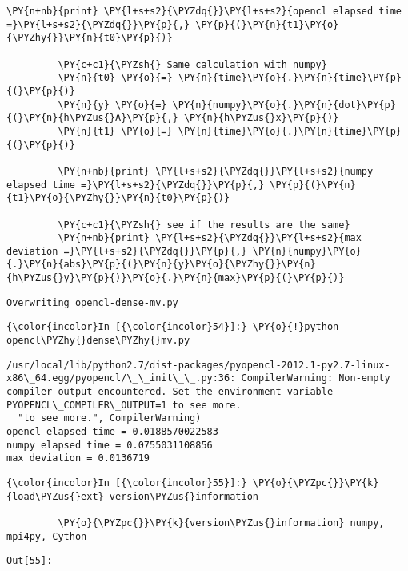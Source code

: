 \begin{Verbatim}[commandchars=\\\{\}]
         \PY{n+nb}{print} \PY{l+s+s2}{\PYZdq{}}\PY{l+s+s2}{opencl elapsed time =}\PY{l+s+s2}{\PYZdq{}}\PY{p}{,} \PY{p}{(}\PY{n}{t1}\PY{o}{\PYZhy{}}\PY{n}{t0}\PY{p}{)}
         
         \PY{c+c1}{\PYZsh{} Same calculation with numpy}
         \PY{n}{t0} \PY{o}{=} \PY{n}{time}\PY{o}{.}\PY{n}{time}\PY{p}{(}\PY{p}{)}
         \PY{n}{y} \PY{o}{=} \PY{n}{numpy}\PY{o}{.}\PY{n}{dot}\PY{p}{(}\PY{n}{h\PYZus{}A}\PY{p}{,} \PY{n}{h\PYZus{}x}\PY{p}{)}
         \PY{n}{t1} \PY{o}{=} \PY{n}{time}\PY{o}{.}\PY{n}{time}\PY{p}{(}\PY{p}{)}
         
         \PY{n+nb}{print} \PY{l+s+s2}{\PYZdq{}}\PY{l+s+s2}{numpy elapsed time =}\PY{l+s+s2}{\PYZdq{}}\PY{p}{,} \PY{p}{(}\PY{n}{t1}\PY{o}{\PYZhy{}}\PY{n}{t0}\PY{p}{)}
         
         \PY{c+c1}{\PYZsh{} see if the results are the same}
         \PY{n+nb}{print} \PY{l+s+s2}{\PYZdq{}}\PY{l+s+s2}{max deviation =}\PY{l+s+s2}{\PYZdq{}}\PY{p}{,} \PY{n}{numpy}\PY{o}{.}\PY{n}{abs}\PY{p}{(}\PY{n}{y}\PY{o}{\PYZhy{}}\PY{n}{h\PYZus{}y}\PY{p}{)}\PY{o}{.}\PY{n}{max}\PY{p}{(}\PY{p}{)}
\end{Verbatim}

    \begin{Verbatim}[commandchars=\\\{\}]
Overwriting opencl-dense-mv.py

    \end{Verbatim}

    \begin{Verbatim}[commandchars=\\\{\}]
{\color{incolor}In [{\color{incolor}54}]:} \PY{o}{!}python opencl\PYZhy{}dense\PYZhy{}mv.py
\end{Verbatim}

    \begin{Verbatim}[commandchars=\\\{\}]
/usr/local/lib/python2.7/dist-packages/pyopencl-2012.1-py2.7-linux-x86\_64.egg/pyopencl/\_\_init\_\_.py:36: CompilerWarning: Non-empty compiler output encountered. Set the environment variable PYOPENCL\_COMPILER\_OUTPUT=1 to see more.
  "to see more.", CompilerWarning)
opencl elapsed time = 0.0188570022583
numpy elapsed time = 0.0755031108856
max deviation = 0.0136719

    \end{Verbatim}







    \begin{Verbatim}[commandchars=\\\{\}]
{\color{incolor}In [{\color{incolor}55}]:} \PY{o}{\PYZpc{}}\PY{k}{load\PYZus{}ext} version\PYZus{}information
         
         \PY{o}{\PYZpc{}}\PY{k}{version\PYZus{}information} numpy, mpi4py, Cython
\end{Verbatim}
\texttt{\color{outcolor}Out[{\color{outcolor}55}]:}
